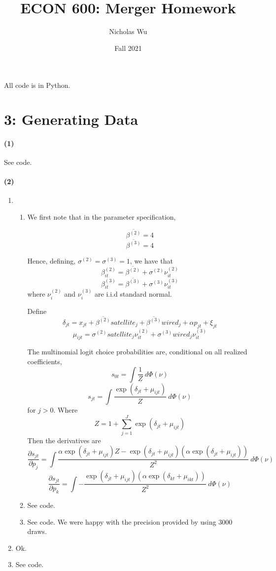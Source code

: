 \documentclass[10pt,letter]{article}
\begin{document}


\title{ECON 600: Merger Homework}

\author{Nicholas Wu}

\date{Fall 2021}

\maketitle

All code is in Python.

\section*{3: Generating Data}
\paragraph{(1)} See code.
\paragraph{(2)}
\begin{enumerate}[label=(\alph*)]
\item \begin{enumerate}[label=(\roman*)]
\item We first note that in the parameter specification,

\[ \overline{\beta^{(2)}} = 4 \]
\[ \overline{\beta^{(3)}} = 4 \]

Hence, defining, $\sigma^{(2)} = \sigma^{(3)} = 1$, we have that
\[ \beta_{it}^{(2)} = \overline{\beta^{(2)}} + \sigma^{(2)} \nu_{it}^{(2)}  \]
\[ \beta_{it}^{(3)} = \overline{\beta^{(3)}} + \sigma^{(3)} \nu_{it}^{(3)}  \]
where $\nu^{(2)}_i$ and $\nu^{(3)}_i$ are i.i.d standard normal.

Define
\[ \delta_{jt} = x_{jt} + \overline{\beta^{(2)}}satellite_j +\overline{\beta^{(3)}}wired_j + \alpha p_{jt} + \xi_{jt} \]
\[ \mu_{ijt} = \sigma^{(2)}satellite_j \nu_{it}^{(2)}  + \sigma^{(3)}wired_j \nu_{it}^{(3)}  \]

The multinomial logit choice probabilities are, conditional on all realized coefficients,
\[ s_{0t} = \int \frac{1}{Z} \ d\Phi(\nu) \]
\[ s_{jt} = \int\frac{\exp(\delta_{jt} + \mu_{ijt})}{Z} \ d\Phi(\nu)  \]
for $j > 0$. Where
\[ Z = 1 + \sum_{j=1}^J \exp(\delta_{jt} + \mu_{ijt}) \]
Then the derivatives are
\[ \frac{\partial s_{jt}}{\partial p_j} = \int\frac{\alpha \exp(\delta_{jt} + \mu_{ijt}) Z - \exp(\delta_{jt} + \mu_{ijt})\left(\alpha\exp(\delta_{jt} + \mu_{ijt})\right)}{Z^2} \ d\Phi(\nu)  \]
\[ \frac{\partial s_{jt}}{\partial p_k} = \int-\frac{\exp(\delta_{jt} + \mu_{ijt})\left(\alpha\exp(\delta_{kt} + \mu_{ikt})\right)}{Z^2} \ d\Phi(\nu)  \]
\item See code.
\item See code. We were happy with the precision provided by using $3000$ draws.
\end{enumerate}
\item Ok.
\item See code.
\end{enumerate}
\end{document}
